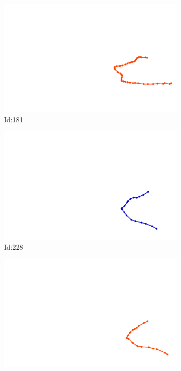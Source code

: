 \documentclass[12pt,twoside]{report}
\begin{document}
\begin{figure}
\centering
\begin{subfigure}[b]{0.20\textwidth}
\centering
\includegraphics[width=\textwidth]{../../trajectories/181.png}
\caption{Id:181}
\end{subfigure}
\begin{subfigure}[b]{0.20\textwidth}
\centering
\includegraphics[width=\textwidth]{../../trajectories/228.png}
\caption{Id:228}
\end{subfigure}
\begin{subfigure}[b]{0.20\textwidth}
\centering
\includegraphics[width=\textwidth]{../../trajectories/716.png}

\end{subfigure}
\end{figure}
\end{document}
